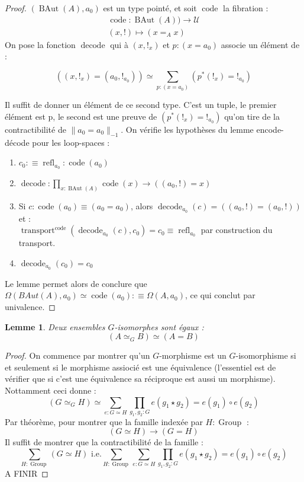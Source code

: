 \documentclass{article}
\DeclareMathOperator{\code}{code}
\DeclareMathOperator{\decode}{decode}
\DeclareMathOperator{\transport}{transport}
\DeclareMathOperator{\refl}{refl}
\DeclareMathOperator{\baut}{BAut}
\DeclareMathOperator{\groupa}{Group}
\newtheorem{lemme}[definition]{Lemme}
\begin{document}
\begin{proof}
  $(\baut(A), a_0)$ est un type pointé, et soit $\code$ la fibration :
  \begin{gather*}
    \code : \baut(A)) \to \mathcal{U} \\
    (x,!) \mapsto (x =_{A} x)
  \end{gather*}
  On pose la fonction $\decode$ qui à $(x,!_{x})$ et $p : (x = a_0)$ associe un élément de :

  \[((x,!_{x}) = (a_0,!_{a_{0}})) \simeq \displaystyle\sum_{p : (x = a_0)}(p^{*}(!_{x}) = !_{a_0})\]

  Il suffit de donner un élément de ce second type. C'est un tuple, le premier élément est p, le second est une preuve de $(p^{*}(!_{x}) = !_{a_{0}})$ qu'on tire de la contractibilité de $\|a_0 = a_{0}\|_{-1}$. On vérifie les hypothèses du lemme encode-décode pour les loop-spaces :
  \begin{enumerate}
    \item $c_0 :\equiv \refl_{a_0} : \code(a_0)$
    \item $\decode : \prod_{x : \baut(A)} \code(x) \to ((a_{0},!) = x)$
    \item Si $c : \code(a_0) \equiv (a_0 = a_0)$, alors $\decode_{a_0}(c) = ((a_{0},!) = (a_{0},!))$ et :\\
          $\transport^{\code}(\decode_{a_0}(c), c_0) = c_0 \equiv \refl_{a_0}$ par construction du transport.
    \item $\decode_{a_0}(c_0) = c_{0}$
  \end{enumerate}

  Le lemme permet alors de conclure que $\Omega(BAut(A), a_0) \simeq \code(a_0) :\equiv \Omega(A,a_0)$, ce qui conclut par univalence.
\end{proof}

\begin{lemme}
  Deux ensembles $G$-isomorphes sont égaux :
    \[(A \simeq_{G} B) \simeq (A = B)\]
\end{lemme}

\begin{proof}
  On commence par montrer qu'un $G$-morphisme est un $G$-isomorphisme si et seulement si le morphisme assiocié est une équivalence (l'essentiel est de vérifier que si c'est une équivalence sa réciproque est aussi un morphisme). Nottamment ceci donne :
  \[(G \simeq_{G} H) \simeq \displaystyle\sum_{e : G \simeq H}\displaystyle\prod_{g_1,g_2 : G}e(g_1\star g_2) = e(g_1) \circ e(g_2)\]
  Par théorème, pour montrer que la famille indexée par $H : \groupa$ :
  \[ (G \simeq H) \to (G = H)\]
  Il suffit de montrer que la contractibilité de la famille :
  \[\sum_{H : \groupa} (G \simeq H) \text{  i.e.} \sum_{H : \groupa}\sum_{e : G \simeq H}\prod_{g_1,g_2 : G}e(g_1\star g_2) = e(g_1) \circ e(g_2)\]
  A FINIR
\end{proof}
\end{document}
